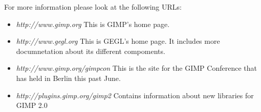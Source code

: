 
For more information please look at the following URLs:
\begin{itemize}
\item {\em http://www.gimp.org} This is GIMP's home page.
\item {\em http://www.gegl.org} This is GEGL's home page. It includes more documnetation about its different compoments.
\item {\em http://www.gimp.org/gimpcon} This is the site for the GIMP Conference that has held in Berlin this past June.
\item {\em http://plugins.gimp.org/gimp2} Contains information about new libraries for GIMP 2.0
\end{itemize}
 




